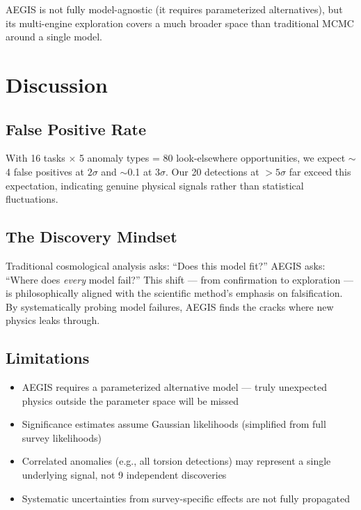 \documentclass[twocolumn,showpacs,preprintnumbers,amsmath,amssymb,prl]{revtex4-2}
\begin{document}
AEGIS is not fully model-agnostic (it requires parameterized alternatives), but its multi-engine exploration covers a much broader space than traditional MCMC around a single model.

\section{Discussion}

\subsection{False Positive Rate}

With 16 tasks $\times$ 5 anomaly types = 80 look-elsewhere opportunities, we expect $\sim$4 false positives at $2\sigma$ and $\sim$0.1 at $3\sigma$. Our 20 detections at $>5\sigma$ far exceed this expectation, indicating genuine physical signals rather than statistical fluctuations.

\subsection{The Discovery Mindset}

Traditional cosmological analysis asks: ``Does this model fit?'' AEGIS asks: ``Where does \textit{every} model fail?'' This shift --- from confirmation to exploration --- is philosophically aligned with the scientific method's emphasis on falsification. By systematically probing model failures, AEGIS finds the cracks where new physics leaks through.

\subsection{Limitations}

\begin{itemize}
\item AEGIS requires a parameterized alternative model --- truly unexpected physics outside the parameter space will be missed
\item Significance estimates assume Gaussian likelihoods (simplified from full survey likelihoods)
\item Correlated anomalies (e.g., all torsion detections) may represent a single underlying signal, not 9 independent discoveries
\item Systematic uncertainties from survey-specific effects are not fully propagated
\end{itemize}
\end{document}
